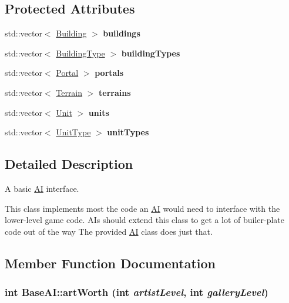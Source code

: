 \subsection*{Protected Attributes}
\begin{CompactItemize}
\item 
\hypertarget{classBaseAI_2011b88e94ad95891cc22e54e07d775f}{
std::vector$<$ \hyperlink{classBuilding}{Building} $>$ \textbf{buildings}}
\label{classBaseAI_2011b88e94ad95891cc22e54e07d775f}

\item 
\hypertarget{classBaseAI_e839247231149b52f58a529d036971f5}{
std::vector$<$ \hyperlink{classBuildingType}{BuildingType} $>$ \textbf{buildingTypes}}
\label{classBaseAI_e839247231149b52f58a529d036971f5}

\item 
\hypertarget{classBaseAI_52920c16eee7a0c9711af944b7326f68}{
std::vector$<$ \hyperlink{classPortal}{Portal} $>$ \textbf{portals}}
\label{classBaseAI_52920c16eee7a0c9711af944b7326f68}

\item 
\hypertarget{classBaseAI_325d3a3424817f1a523809076264cd1c}{
std::vector$<$ \hyperlink{classTerrain}{Terrain} $>$ \textbf{terrains}}
\label{classBaseAI_325d3a3424817f1a523809076264cd1c}

\item 
\hypertarget{classBaseAI_9e5ccdbf76c15c90ea60473b21cf20b5}{
std::vector$<$ \hyperlink{classUnit}{Unit} $>$ \textbf{units}}
\label{classBaseAI_9e5ccdbf76c15c90ea60473b21cf20b5}

\item 
\hypertarget{classBaseAI_5166578fd49bee3afa04552947058c34}{
std::vector$<$ \hyperlink{classUnitType}{UnitType} $>$ \textbf{unitTypes}}
\label{classBaseAI_5166578fd49bee3afa04552947058c34}

\end{CompactItemize}


\subsection{Detailed Description}
A basic \hyperlink{classAI}{AI} interface. 

This class implements most the code an \hyperlink{classAI}{AI} would need to interface with the lower-level game code. AIs should extend this class to get a lot of builer-plate code out of the way The provided \hyperlink{classAI}{AI} class does just that. 

\subsection{Member Function Documentation}
\hypertarget{classBaseAI_9a6e10da16c3b209915251ca183815e7}{
\subsubsection[{artWorth}]{\setlength{\rightskip}{0pt plus 5cm}int BaseAI::artWorth (int {\em artistLevel}, \/  int {\em galleryLevel})}}
\label{classBaseAI_9a6e10da16c3b209915251ca183815e7}


